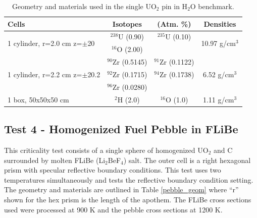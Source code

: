 \documentclass[preprint,12pt]{elsarticle}
\begin{document}
\begin{table}[h]
\centering
\caption{Geometry and materials used in the single UO$_2$ pin in H$_2$O benchmark.}
\label{uo2_pincell_geom}
\begin{tabular}{| l | c  c | c |}
\hline
Cells & Isotopes & (Atm. \%)& Densities \\
\hline
\multirow{2}{*}{1 cylinder, r=2.0 cm z=$\pm$20 }  &   $^{238}$U   (0.90) &  $^{235}$U   (0.10) &  \multirow{2}{*}{10.97 g/cm$^3$} \\
                                                                              &   $^{16}$O    (2.00)  &                              &  \\
\hline
\multirow{3}{*}{1 cylinder, r=2.2 cm z=$\pm$20.2}  &   $^{90}$Zr   (0.5145) &  $^{91}$Zr   (0.1122)&  \multirow{3}{*}{6.52 g/cm$^3$} \\
                                                   &   $^{92}$Zr   (0.1715) &  $^{94}$Zr   (0.1738)& \\
                                                   &   $^{96}$Zr   (0.0280) &                      & \\
\hline
\multirow{1}{*}{1 box, 50x50x50 cm }  &    $^{2}$H   (2.0) & $^{16}$O   (1.0) &   \multirow{1}{*}{1.11 g/cm$^3$} \\
\hline
\end{tabular}
\end{table}



\subsection{Test 4 - Homogenized Fuel Pebble in FLiBe}

This criticality test consists of a single sphere of homogenized UO$_2$ and C surrounded by molten FLiBe (Li$_2$BeF$_4$) salt.  The outer cell is a right hexagonal prism with specular reflective boundary conditions.  This test uses two temperatures simultaneously and tests the reflective boundary condition setting.  The geometry and materials are outlined in Table \ref{pebble_geom} where ``r'' shown for the hex prism is the length of the apothem.  The FLiBe cross sections used were processed at 900 K and the pebble cross sections at 1200 K.
\end{document}
